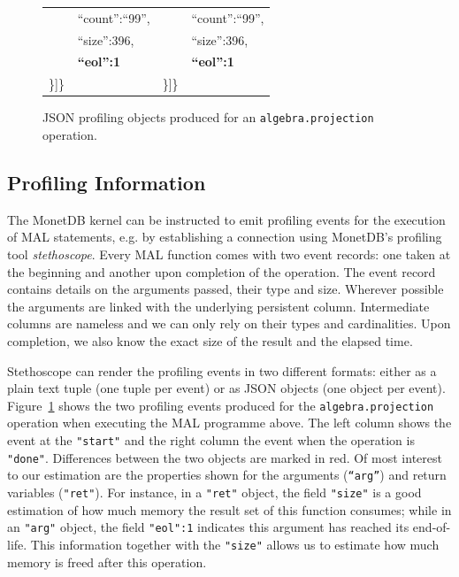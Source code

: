 \documentclass[conference]{IEEEtran}
\begin{document}
\begin{figure}[t]
{\begin{tabular}{|l@{~}l|}
 ~~~~   ``count'':``99'',                                 &   ~~~~    ``count'':``99'',                                  \\
 ~~~~   ``size'':396,                                     &   ~~~~    ``size'':396,                                      \\
 ~~~~   \textbf{``eol'':1}                                &   ~~~~    \textbf{``eol'':1}                                 \\
   \}]\}                                                  &      \}]\}                                                   \\
\hline
\end{tabular}
}
\caption{JSON profiling objects produced for an \texttt{\small algebra.projection} operation.}
\label{fig:json_obj}
\end{figure}

\subsection{Profiling Information}

The MonetDB kernel can be instructed to emit profiling events for the execution of MAL statements, e.g. by establishing a connection using MonetDB’s profiling tool \textit{stethoscope}.
Every MAL function comes with two event records: one taken at the beginning and another upon completion of the operation.
The event record contains details on the arguments passed, their type and size.
Wherever possible the arguments are linked with the underlying persistent column.
Intermediate columns are nameless and we can only rely on their types and cardinalities.
Upon completion, we also know the exact size of the result and the elapsed time.

Stethoscope can render the profiling events in two different formats: either as a  plain text tuple (one tuple per event) or as JSON objects (one object per event).
Figure~\ref{fig:json_obj} shows the two profiling events produced for the \texttt{\small algebra.projection} operation when executing the MAL programme above.
The left column shows the event at the \texttt{\small "start"} and the right column the event when the operation is \texttt{\small "done"}.
Differences between the two objects are marked in red.
Of most interest to our estimation are the properties shown for the arguments  (\texttt{\small “arg”}) and return variables (\texttt{\small "ret"}).
For instance, in a \texttt{\small "ret"} object, the field \texttt{\small "size"} is a good estimation of how much memory the result set of this function consumes; while in an \texttt{\small "arg"} object, the field \texttt{\small "eol":1} indicates this argument has reached its end-of-life.
This information together with the \texttt{\small "size"} allows us to estimate how much memory is freed after this operation.
\end{document}
